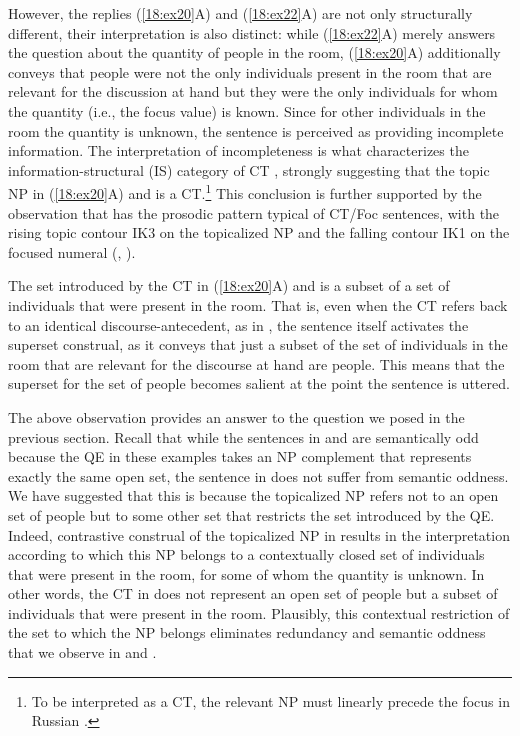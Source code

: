 \documentclass[output=paper,
modfonts,
newtxmath,
hidelinks
]{langscibook}
\begin{document}
\largerpage[2]
\noindent However, the replies (\ref{18:ex20}A) and (\ref{18:ex22}A) are not only structurally different, their interpretation is also distinct: while (\ref{18:ex22}A) merely answers the question about the quantity of people in the room, (\ref{18:ex20}A) additionally conveys that people were not the only individuals present in the room that are relevant for the discussion at hand but they were the only individuals for whom the quantity (i.e., the focus value) is known. Since for other individuals in the room the quantity is unknown, the sentence is perceived as providing incomplete information. The interpretation of incompleteness is what characterizes the information-structural (IS) category of CT \citep{Büring2003}, strongly suggesting that the topic NP in (\ref{18:ex20}A) and  is a CT.\footnote{\label{18:fn18}To be interpreted as a CT, the relevant NP must linearly precede the focus in Russian \citep{Titov2013}.} This conclusion is further supported by the observation that  has the prosodic pattern typical of CT/Foc sentences, with the rising topic contour IK3 on the topicalized NP and the falling contour IK1 on the focused numeral (\citealt{Bryzgunova1971, Bryzgunova1981}, \citealt{Titov2013}).

The set introduced by the CT in (\ref{18:ex20}A) and  is a subset of a set of individuals that were present in the room. That is, even when the CT refers back to an identical discourse-antecedent, as in , the sentence itself activates the superset construal, as it conveys that just a subset of the set of individuals in the room that are relevant for the discourse at hand are people. This means that the superset for the set of people becomes salient at the point the sentence is uttered.

The above observation provides an answer to the question we posed in the previous section. Recall that while the sentences in  and  are semantically odd because the QE in these examples takes an NP complement that represents exactly the same open set, the sentence in  does not suffer from semantic oddness. We have suggested that this is because the topicalized NP refers not to an open set of people but to some other set that restricts the set introduced by the QE. Indeed, contrastive construal of the topicalized NP in  results in the interpretation according to which this NP belongs to a contextually closed set of individuals that were present in the room, for some of whom the quantity is unknown. In other words, the CT in  does not represent an open set of people but a subset of individuals that were present in the room. Plausibly, this contextual restriction of the set to which the NP belongs eliminates redundancy and semantic oddness that we observe in  and .
\end{document}
